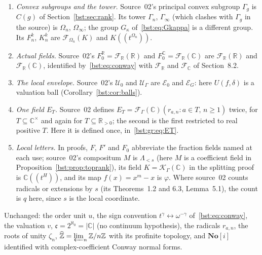 \documentclass[11pt,letterpaper]{article}
\theoremstyle{definition}
\theoremstyle{remark}
\newcommand{\Q}{\mathbb Q}
\newcommand{\R}{\mathbb R}
\newcommand{\C}{\mathbb C}
\newcommand{\Z}{\mathbb Z}
\newcommand{\No}{\mathbf{No}}
\newcommand{\HH}[2]{#1((t^{#2}))}
\newcommand{\FF}[2]{\mathcal F_{#2}(#1)}
\newcommand{\cc}{\mathfrak c}
\newcommand{\abs}[1]{\lvert #1\rvert}
\newcommand{\Zh}{\widehat{\Z}}
\begin{document}
\begin{enumerate}
first, as in Theorem~\ref{bst:thm:descent} and~\eqref{bst:eq:collapse}; its
cofinal subgroup $H\subseteq\Gamma$ (its Theorem~3.5) is $H\subseteq G$. Its
dominating exponent $h$ is $\theta$, as in Section~8.4, where $\theta$ is
already a surreal exponent above $G$: here $h$ is a series in
$f=at^g(1+h)$ and an element of $H$. Its lexicographic $\Q h\oplus\Gamma$ is
$\Q\theta\oplus H$.
\item \emph{Convex subgroups and the tower.} Source~02's principal convex
subgroup $\Gamma_g$ is $C(g)$ of Section~\ref{bst:sec:rank}. Its tower
$\Gamma_n$, $\Gamma_\infty$ (which clashes with $\Gamma_g$ in the source) is
$\Omega_n$, $\Omega_\infty$; the group $G_\kappa$ of~\eqref{bst:eq:Gkappa} is a
different group. Its $F_n^k$, $K_n^k$ are $\FF K{\Omega_n}$ and $\HH K{\Omega_n}$.
\item \emph{Actual fields.} Source~02's $F_0^\R=\mathcal F_\R(\R)$ and
$F_0^\C=\mathcal F_\R(\C)$ are $\FF{\R}{\R}$ and $\FF{\C}{\R}$, identified
by~\eqref{bst:eq:conway} with $\mathscr F_\R$ and $\mathscr F_\C$ of
Section~8.2.
\item \emph{The local envelope.} Source~02's $\mathcal U_0$ and
$\mathcal U_\Gamma$ are $\mathcal E_0$ and $\mathcal E_G$: here $U(f,\delta)$
is a valuation ball (Corollary~\ref{bst:cor:balls}).
\item \emph{One field $E_T$.} Source~02 defines
$E_T=\mathcal F_\Gamma(\C)(r_{a,n}:a\in T,\,n\ge1)$ twice, for
$T\subseteq\C^\times$ and again for $T\subseteq\R_{>0}$; the second is the
first restricted to real positive $T$. Here it is defined once,
in~\eqref{bst:gr:eq:ET}.
\item \emph{Local letters.} In proofs, $F$, $F'$ and $F_0$ abbreviate the
fraction fields named at each use; source~02's compositum $M$ is
$\Lambda_{<s}$ (here $M$ is a coefficient field in
Proposition~\ref{bst:prop:toprank}), its field $K=\mathcal K_\Gamma(\C)$ in
the splitting proof is $\HH{\C}H$, and its map $f(x)=x^m-x$ is $\varphi$.
Where source~02 counts radicals or extensions by $s$ (its Theorems~1.2 and
6.3, Lemma~5.1), the count is $q$ here, since $s$ is the local coordinate.
\end{enumerate}
Unchanged: the order unit $u$, the sign convention $t^\gamma\leftrightarrow\omega^{-\gamma}$
of~\eqref{bst:eq:conway}, the valuation $v$, $\cc=2^{\aleph_0}=\abs{\C}$ (no
continuum hypothesis), the radicals $r_{a,n}$, the roots of unity $\zeta_n$,
$\Zh=\varprojlim_n\Z/n\Z$ with its profinite topology, and $\No[i]$
identified with complex-coefficient Conway normal forms.
\end{document}
